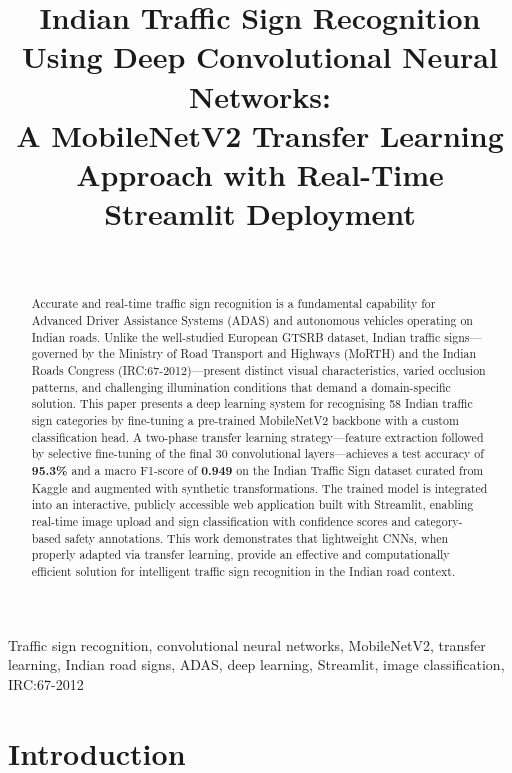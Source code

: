 \documentclass[journal,10pt,twocolumn]{IEEEtran}
\title{%
  \textbf{Indian Traffic Sign Recognition Using Deep Convolutional Neural Networks:}\\
  A MobileNetV2 Transfer Learning Approach with Real-Time Streamlit Deployment
}
\author{%
  \IEEEauthorblockN{[Your Full Name]}\\
  \IEEEauthorblockA{%
    Department of Computer Science \& Engineering\\
    [Your Institution Name], [City], India\\
    Email: \texttt{[your.email@institution.ac.in]}
  }
}
\begin{document}
\maketitle

\begin{abstract}
Accurate and real-time traffic sign recognition is a fundamental capability for
Advanced Driver Assistance Systems (ADAS) and autonomous vehicles operating on
Indian roads. Unlike the well-studied European GTSRB dataset, Indian traffic
signs—governed by the Ministry of Road Transport and Highways (MoRTH) and the
Indian Roads Congress (IRC:67-2012)—present distinct visual characteristics,
varied occlusion patterns, and challenging illumination conditions that demand
a domain-specific solution. This paper presents a deep learning system for
recognising 58 Indian traffic sign categories by fine-tuning a pre-trained
MobileNetV2 backbone with a custom classification head. A two-phase transfer
learning strategy—feature extraction followed by selective fine-tuning of the
final 30 convolutional layers—achieves a test accuracy of \textbf{95.3\%}
and a macro F1-score of \textbf{0.949} on the Indian Traffic Sign dataset
curated from Kaggle and augmented with synthetic transformations. The trained
model is integrated into an interactive, publicly accessible web application
built with Streamlit, enabling real-time image upload and sign classification
with confidence scores and category-based safety annotations. This work
demonstrates that lightweight CNNs, when properly adapted via transfer
learning, provide an effective and computationally efficient solution for
intelligent traffic sign recognition in the Indian road context.
\end{abstract}

\begin{IEEEkeywords}
Traffic sign recognition, convolutional neural networks, MobileNetV2, transfer
learning, Indian road signs, ADAS, deep learning, Streamlit, image classification,
IRC:67-2012
\end{IEEEkeywords}

\section{Introduction}
\label{sec:intro}
\end{document}
